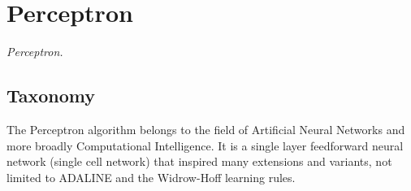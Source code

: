 

\section{Perceptron} 
\label{sec:perceptron}

\emph{Perceptron.}

\subsection{Taxonomy}
The Perceptron algorithm belongs to the field of Artificial Neural Networks and more broadly Computational Intelligence.
It is a single layer feedforward neural network (single cell network) that inspired many extensions and variants, not limited to ADALINE and the Widrow-Hoff learning rules.

